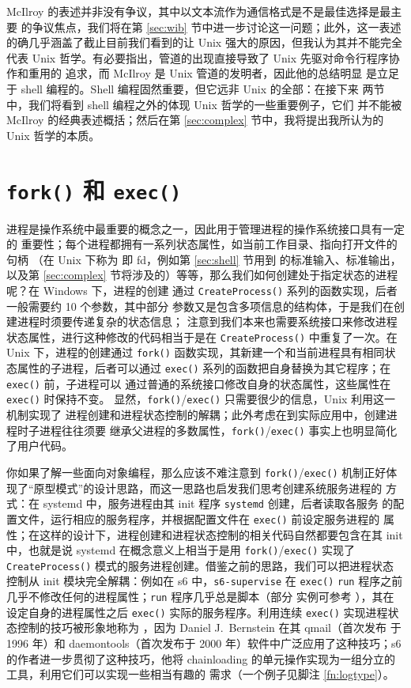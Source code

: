 McIlroy 的表述并非没有争议，其中以文本流作为通信格式是不是最佳选择是最主要
的争议焦点，我们将在第 \ref{sec:wib} 节中进一步讨论这一问题；此外，这一表述
的确几乎涵盖了截止目前我们看到的让 Unix 强大的原因，但我认为其并不能完全代表
Unix 哲学。有必要指出，管道的出现直接导致了 Unix 先驱对命令行程序协作和重用的
追求，而 McIlroy 是 Unix 管道的发明者，因此他的总结明显
是立足于 shell 编程的。Shell 编程固然重要，但它远非 Unix 的全部：在接下来
两节中，我们将看到 shell 编程之外的体现 Unix 哲学的一些重要例子，它们
并不能被 McIlroy 的经典表述概括；然后在第 \ref{sec:complex}
节中，我将提出我所认为的 Unix 哲学的本质。

\section{\texttt{fork()} 和 \texttt{exec()}}\label{sec:exec}

进程是操作系统中最重要的概念之一，因此用于管理进程的操作系统接口具有一定的
重要性；每个进程都拥有一系列状态属性，如当前工作目录、指向打开文件的句柄
（在 Unix 下称为 即 fd，例如第 \ref{sec:shell} 节用到
的标准输入、标准输出，以及第 \ref{sec:complex} 节将涉及的）等等，那么我们如何创建处于指定状态的进程呢？在 Windows 下，进程的创建
通过 \verb|CreateProcess()| 系列的函数实现，后者一般需要约 10 个参数，其中部分
参数又是包含多项信息的结构体，于是我们在创建进程时须要传递复杂的状态信息；
注意到我们本来也需要系统接口来修改进程状态属性，进行这种修改的代码相当于是在
\verb|CreateProcess()| 中重复了一次。在 Unix 下，进程的创建通过 \verb|fork()|
函数实现，其新建一个和当前进程具有相同状态属性的子进程，后者可以通过
\verb|exec()| 系列的函数把自身替换为其它程序；在 \verb|exec()| 前，子进程可以
通过普通的系统接口修改自身的状态属性，这些属性在 \verb|exec()| 时保持不变。
显然，\verb|fork()|/\verb|exec()| 只需要很少的信息，Unix 利用这一机制实现了
进程创建和进程状态控制的解耦；此外考虑在到实际应用中，创建进程时子进程往往须要
继承父进程的多数属性，\verb|fork()|/\verb|exec()| 事实上也明显简化了用户代码。

你如果了解一些面向对象编程，那么应该不难注意到 \verb|fork()|/\verb|exec()|
机制正好体现了“原型模式”的设计思路，而这一思路也启发我们思考创建系统服务进程的
方式：在 systemd 中，服务进程由其 init 程序 \verb|systemd| 创建，后者读取各服务
的配置文件，运行相应的服务程序，并根据配置文件在 \verb|exec()| 前设定服务进程的
属性；在这样的设计下，进程创建和进程状态控制的相关代码自然都要包含在其 init
中，也就是说 systemd 在概念意义上相当于是用 \verb|fork()|/\verb|exec()| 实现了
\verb|CreateProcess()| 模式的服务进程创建。借鉴之前的思路，我们可以把进程状态
控制从 init 模块完全解耦：例如在 s6 中，\verb|s6-supervise| 在 \verb|exec()|
\verb|run| 程序之前几乎不修改任何的进程属性；\verb|run| 程序几乎总是脚本（部分
实例可参考 \parencite{pollard2014}），其在设定自身的进程属性之后 \verb|exec()|
实际的服务程序。利用连续 \verb|exec()| 实现进程状态控制的技巧被形象地称为
，因为 Daniel J.\ Bernstein 在其 qmail（首次发布
于 1996 年）和 daemontools（首次发布于 2000 年）软件中广泛应用了这种技巧；s6
的作者进一步贯彻了这种技巧，他将 chainloading 的单元操作实现为一组分立的
工具，利用它们可以实现一些相当有趣的
需求（一个例子见脚注 \ref{fn:logtype}）。

